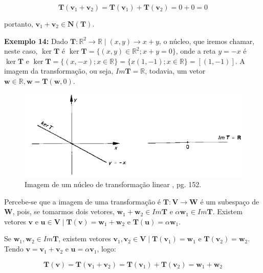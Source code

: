 \begin{equation}
\mathbf{T}(\mathbf{v}_1 + \mathbf{v}_2) = \mathbf{T}(\mathbf{v}_1) + \mathbf{T}(\mathbf{v}_2) = 0 + 0 = 0
\end{equation}

\noindent portanto, $\mathbf{v}_1 + \mathbf{v}_2 \in \mathbf{N}(\mathbf{T})$. 

\noindent\textbf{Exemplo 14:} Dado $\mathbf{T}: \mathbb{R}^2 \longrightarrow \mathbb{R} \mid (x, y) \rightarrow x + y$, o núcleo, que iremos chamar, neste caso, $\ker\mathbf{T}$ é $\ker\mathbf{T} = \{(x, y) \in \mathbb{R}^2; x + y = 0\}$, onde a reta $y = -x$ é $\ker\mathbf{T}$ e $\ker\mathbf{T} = \{(x, -x); x \in \mathbb{R}\} = \{x(1, -1); x \in \mathbb{R}\} = [(1, -1)]$. A imagem da transformação, ou seja, $Im\mathbf{T} = \mathbb{R}$, todavia, um vetor $\mathbf{w} \in \mathbb{R}, \mathbf{w} = \mathbf{T}(\mathbf{w}, 0)$.

\begin{figure}[H]
	\centering
	\includegraphics[scale=1.00]{t_nucleo2.png}
	\caption{Imagem de um núcleo de transformação linear \cite{boldrini1980}, pg. 152.}
\end{figure}

Percebe-se que a imagem de uma transformação é $\mathbf{T}: \mathbf{V} \longrightarrow \mathbf{W}$ é um subespaço de $\mathbf{W}$, pois, se tomarmos dois vetores, $\mathbf{w}_1 + \mathbf{w}_2 \in Im\mathbf{T}$ e $\alpha\mathbf{w}_1 \in Im\mathbf{T}$. Existem vetores $\mathbf{v}$ e $\mathbf{u} \in \mathbf{V} \mid \mathbf{T}(\mathbf{v}) = \mathbf{w}_1 + \mathbf{w}_2$ e $\mathbf{T}(\mathbf{u}) = \alpha\mathbf{w}_1$.

Se $\mathbf{w}_1, \mathbf{w}_2 \in Im\mathbf{T}$, existem vetores $\mathbf{v}_1, \mathbf{v}_2 \in \mathbf{V} \mid \mathbf{T}(\mathbf{v}_1) = \mathbf{w}_1$ e $\mathbf{T}(\mathbf{v}_2) = \mathbf{w}_2$. Tendo $\mathbf{v} = \mathbf{v}_1 + \mathbf{v}_2$ e $\mathbf{u} = \alpha\mathbf{v}_1$, logo:

\begin{equation}
\mathbf{T}(\mathbf{v}) = \mathbf{T}(\mathbf{v}_1 + \mathbf{v}_2) = \mathbf{T}(\mathbf{v}_1) + \mathbf{T}(\mathbf{v}_2) = \mathbf{w}_1 + \mathbf{w}_2
\end{equation}

